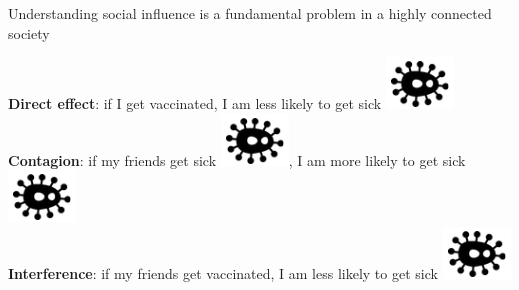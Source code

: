 \documentclass[final]{beamer}
\newlength{\colwidth}
\begin{document}
\begin{frame}[t]
\begin{columns}[t]
\begin{column}{\colwidth}
\begin{block}{Understanding social influence is a fundamental problem in a highly connected society}
\begin{minipage}{.25\textwidth}
                \end{minipage}
                \begin{minipage}{.75\textwidth}
                    \vspace{7mm}
                    \textbf{Direct effect}: if I get \textcolor{Mahogany}{vaccinated}, I am less likely to get sick \includegraphics[scale=0.4]{./figures/bacteria.png}
                    \vspace{6mm} \\
                    \textbf{Contagion}: if my friends get sick \includegraphics[scale=0.4]{./figures/bacteria.png}, I am more likely to get sick \includegraphics[scale=0.4]{./figures/bacteria.png}
                    \vspace{6mm} \\
                    \textbf{Interference}: if my friends get \textcolor{Mahogany}{vaccinated}, I am less likely to get sick \includegraphics[scale=0.4]{./figures/bacteria.png}
                \end{minipage}
            \end{block}


\end{column}
\end{columns}
\end{frame}
\end{document}

